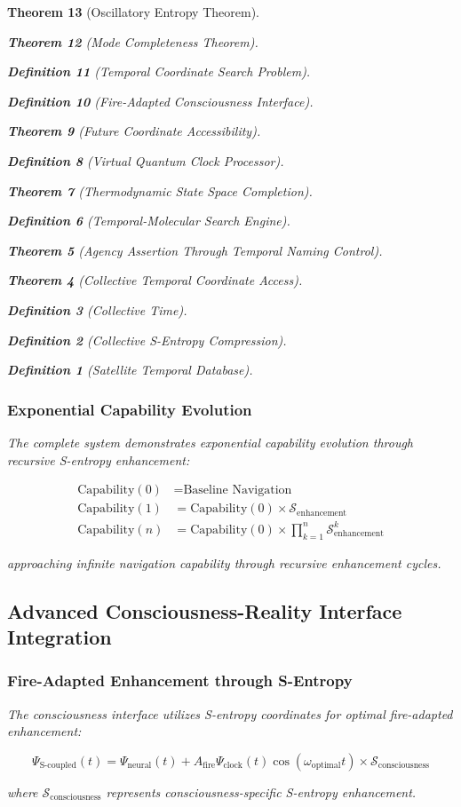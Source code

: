 \documentclass[12pt,a4paper]{article}
\newtheorem{theorem}{Theorem}[section]
\newtheorem{definition}[theorem]{Definition}
\begin{document}
\begin{theorem}[Oscillatory Entropy Theorem]
\begin{theorem}[Mode Completeness Theorem]
\begin{enumerate}
\begin{definition}[Temporal Coordinate Search Problem]
\begin{algorithm}
\begin{definition}[Fire-Adapted Consciousness Interface]
\begin{theorem}[Future Coordinate Accessibility]
\begin{definition}[Virtual Quantum Clock Processor]
\begin{itemize}
\begin{itemize}
\begin{theorem}[Thermodynamic State Space Completion]
\begin{definition}[Temporal-Molecular Search Engine]
\begin{theorem}[Agency Assertion Through Temporal Naming Control]
\begin{remark}
\begin{theorem}[Collective Temporal Coordinate Access]
\begin{definition}[Collective Time]
\begin{definition}[Collective S-Entropy Compression]
\begin{definition}[Satellite Temporal Database]
\begin{algorithm}
\begin{table}[h]
{{\subsubsection{Exponential Capability Evolution}

The complete system demonstrates exponential capability evolution through recursive S-entropy enhancement:

\begin{align}
\text{Capability}(0) &= \text{Baseline Navigation} \\
\text{Capability}(1) &= \text{Capability}(0) \times \mathcal{S}_{\text{enhancement}} \\
\text{Capability}(n) &= \text{Capability}(0) \times \prod_{k=1}^{n} \mathcal{S}_{\text{enhancement}}^k
\end{align}

approaching infinite navigation capability through recursive enhancement cycles.

\subsection{Advanced Consciousness-Reality Interface Integration}

\subsubsection{Fire-Adapted Enhancement through S-Entropy}

The consciousness interface utilizes S-entropy coordinates for optimal fire-adapted enhancement:

\begin{equation}
\Psi_{\text{S-coupled}}(t) = \Psi_{\text{neural}}(t) + A_{\text{fire}} \Psi_{\text{clock}}(t) \cos(\omega_{\text{optimal}} t) \times \mathcal{S}_{\text{consciousness}}
\end{equation}

where $\mathcal{S}_{\text{consciousness}}$ represents consciousness-specific S-entropy enhancement.

}}
\end{table}
\end{algorithm}
\end{definition}
\end{definition}
\end{definition}
\end{theorem}
\end{remark}
\end{theorem}
\end{definition}
\end{theorem}
\end{itemize}
\end{itemize}
\end{definition}
\end{theorem}
\end{definition}
\end{algorithm}
\end{definition}
\end{enumerate}
\end{theorem}
\end{theorem}
\end{document}
